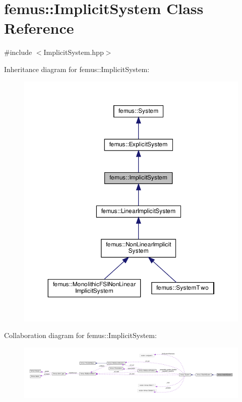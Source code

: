 \hypertarget{classfemus_1_1_implicit_system}{}\section{femus\+:\+:Implicit\+System Class Reference}
\label{classfemus_1_1_implicit_system}


{\ttfamily \#include $<$Implicit\+System.\+hpp$>$}



Inheritance diagram for femus\+:\+:Implicit\+System\+:
\nopagebreak
\begin{figure}[H]
\begin{center}
\leavevmode
\includegraphics[width=350pt]{classfemus_1_1_implicit_system__inherit__graph}
\end{center}
\end{figure}


Collaboration diagram for femus\+:\+:Implicit\+System\+:
\nopagebreak
\begin{figure}[H]
\begin{center}
\leavevmode
\includegraphics[width=350pt]{classfemus_1_1_implicit_system__coll__graph}
\end{center}
\end{figure}
